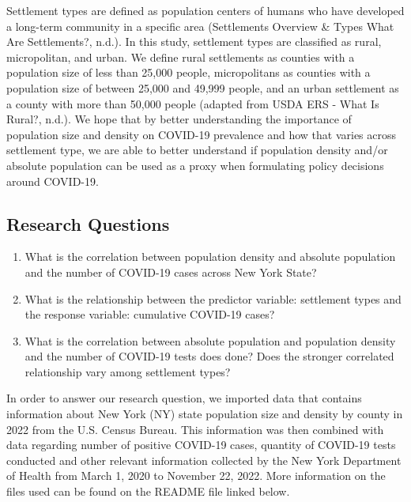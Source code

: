 \documentclass[
  12pt,
]{article}
\begin{document}
Settlement types are defined as population centers of humans who have
developed a long-term community in a specific area (Settlements Overview
\& Types \textbar{} What Are Settlements?, n.d.). In this study,
settlement types are classified as rural, micropolitan, and urban. We
define rural settlements as counties with a population size of less than
25,000 people, micropolitans as counties with a population size of
between 25,000 and 49,999 people, and an urban settlement as a county
with more than 50,000 people (adapted from USDA ERS - What Is Rural?,
n.d.). We hope that by better understanding the importance of population
size and density on COVID-19 prevalence and how that varies across
settlement type, we are able to better understand if population density
and/or absolute population can be used as a proxy when formulating
policy decisions around COVID-19.

\hypertarget{research-questions}{%
\subsection{Research Questions}\label{research-questions}}

\begin{enumerate}
\def\labelenumi{\arabic{enumi}.}
\item
  What is the correlation between population density and absolute
  population and the number of COVID-19 cases across New York State?
\item
  What is the relationship between the predictor variable: settlement
  types and the response variable: cumulative COVID-19 cases?
\item
  What is the correlation between absolute population and population
  density and the number of COVID-19 tests does done? Does the stronger
  correlated relationship vary among settlement types?
\end{enumerate}

\newpage

In order to answer our research question, we imported data that contains
information about New York (NY) state population size and density by
county in 2022 from the U.S. Census Bureau. This information was then
combined with data regarding number of positive COVID-19 cases, quantity
of COVID-19 tests conducted and other relevant information collected by
the New York Department of Health from March 1, 2020 to November 22,
2022. More information on the files used can be found on the README file
linked below.
\end{document}
